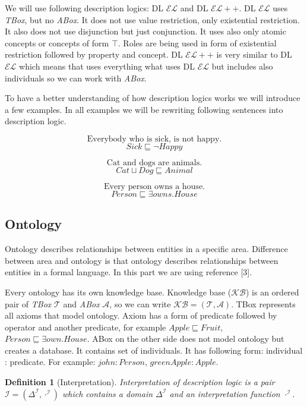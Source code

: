 \documentclass[12pt,a4paper]{article}
\newtheorem{definition}{Definition}[subsection]
\begin{document}
We will use following description logics: DL $\mathcal{EL}$ and DL $\mathcal{EL{+}{+}}$. DL $\mathcal{EL}$  uses \textit{TBox}, but no \textit{ABox}. It does not use value restriction, only existential restriction. It also does not use disjunction but just conjunction. It uses also only atomic concepts or concepts of form $\top$. Roles are being used in form of existential restriction followed by property and concept. DL $\mathcal{EL{+}{+}}$ is very similar to DL $\mathcal{EL}$ which means that uses everything what uses DL $\mathcal{EL}$ but includes also individuals so we can work with \textit{ABox}.

To have a better understanding of how description logics works we will introduce a few examples. In all examples we will be rewriting following sentences into description logic.


\[ \text{Everybody who is sick, is not happy.} \]
\[ Sick \sqsubseteq \neg Happy \]

\[ \text{Cat and dogs are animals.} \]
\[ Cat \sqcup Dog \sqsubseteq Animal \]

\[ \text{Every person owns a house.} \]
\[ Person \sqsubseteq \exists owns.House \]

\subsection{Ontology}
Ontology describes relationships between entities in a specific area. Difference between area and ontology is that ontology describes relationships between entities in a formal language. In this part we are using reference [3].

Every ontology has its own knowledge base. Knowledge base ($\mathcal{KB}$) is an ordered pair of \textit{TBox} $\mathcal{T}$ and \textit{ABox} $\mathcal{A}$, so we can write $\mathcal{KB} = (\mathcal{T}, \mathcal{A})$. TBox represents all axioms that model ontology. Axiom has a form of predicate followed by operator and another predicate, for example $Apple \sqsubseteq Fruit$, $Person \sqsubseteq \exists own.House$. ABox on the other side does not model ontology but creates a database. It contains set of individuals. It has following form: individual : predicate. For example: $john : Person$, $greenApple : Apple$.

\begin{definition}[Interpretation]
	Interpretation of description logic is a pair $\mathcal{I} = (\Delta^{\mathcal{I}}, \cdot ^{\mathcal{I}})$ which contains a domain $\Delta^{\mathcal{I}}$ and an interpretation function $\cdot ^{\mathcal{I}}$.	
\end{definition}
\end{document}
